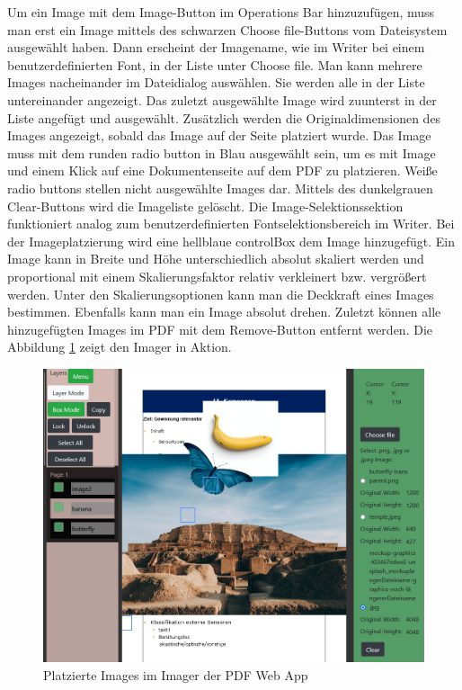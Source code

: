 Um ein Image mit dem Image-Button im Operations Bar hinzuzufügen, muss man erst ein Image mittels des schwarzen Choose file-Buttons vom Dateisystem ausgewählt haben. Dann erscheint der Imagename, wie im Writer bei einem benutzerdefinierten Font, in der Liste unter Choose file. Man kann mehrere Images nacheinander im Dateidialog auswählen. Sie werden alle in der Liste untereinander angezeigt. Das zuletzt ausgewählte Image wird zuunterst in der Liste angefügt und ausgewählt. Zusätzlich werden die Originaldimensionen des Images angezeigt, sobald das Image auf der Seite platziert wurde. Das Image muss mit dem runden radio button in Blau ausgewählt sein, um es mit Image und einem Klick auf eine Dokumentenseite auf dem PDF zu platzieren. Weiße radio buttons stellen nicht ausgewählte Images dar. Mittels des dunkelgrauen Clear-Buttons wird die Imageliste gelöscht. Die Image-Selektionssektion funktioniert analog zum benutzerdefinierten Fontselektionsbereich im Writer. Bei der Imageplatzierung wird eine hellblaue controlBox dem Image hinzugefügt. Ein Image kann in Breite und Höhe unterschiedlich absolut skaliert werden und proportional mit einem Skalierungsfaktor relativ verkleinert bzw. vergrößert werden. Unter den Skalierungsoptionen kann man die Deckkraft eines Images bestimmen. Ebenfalls kann man ein Image absolut drehen. Zuletzt können alle hinzugefügten Images im PDF mit dem Remove-Button entfernt werden. Die Abbildung \ref{fig:imaging} zeigt den Imager in Aktion.

\begin{figure}[!htbp]
	\centering
	\includegraphics[width=1\textwidth]{"images/imaging.png"}
	\caption{Platzierte Images im Imager der PDF Web App}
	\label{fig:imaging}
\end{figure}



